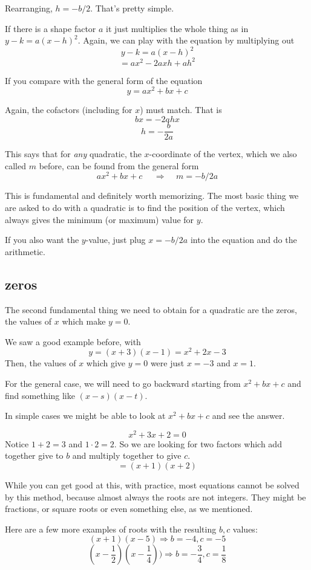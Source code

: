 \documentclass[11pt, oneside]{article}
\begin{document}
Rearranging, $h = -b/2$.  That's pretty simple.

If there is a shape factor $a$ it just multiplies the whole thing as in $y - k = a(x - h)^2$.  Again, we can play with the equation by multiplying out
\[ y - k = a(x - h)^2 \]
\[ = ax^2 - 2axh + ah^2 \]

If you compare with the general form of the equation
\[ y = ax^2 + bx + c \]

Again, the cofactors (including for $x$) must match.  That is
\[ bx = - 2ahx \]
\[ h = - \frac{b}{2a} \]

This says that for \emph{any} quadratic, the $x$-coordinate of the vertex, which we also called $m$ before, can be found from the general form
\[ ax^2 + bx + c  \ \ \ \ \ \ \Rightarrow  \ \ \ \ \ m = -b/2a \]

This is fundamental and definitely worth memorizing.  The most basic thing we are asked to do with a quadratic is to find the position of the vertex, which always gives the minimum (or maximum) value for $y$.

If you also want the $y$-value, just plug $x = -b/2a$ into the equation and do the arithmetic.

\subsection*{zeros}
The second fundamental thing we need to obtain for a quadratic are the zeros, the values of $x$ which make $y = 0$.

We saw a good example before, with
\[ y = (x + 3)(x - 1) = x^2 + 2x - 3 \]
Then, the values of $x$ which give $y = 0$ were just $x = -3$ and $x = 1$.  

For the general case, we will need to go backward starting from $x^2 + bx + c$ and find something like $(x - s)(x - t)$.  

In simple cases we might be able to look at $x^2 + bx + c$ and see the answer.

\[ x^2 + 3x + 2 = 0 \]
Notice $1 + 2 = 3$ and $1 \cdot 2 = 2$.  So we are looking for two factors which add together give to $b$ and multiply together to give $c$.
\[ = (x + 1)(x + 2) \]

While you can get good at this, with practice, most equations cannot be solved by this method, because almost always the roots are not integers.  They might be fractions, or square roots or even something else, as we mentioned.

Here are a few more examples of roots with the resulting $b,c$ values:
\[ (x + 1)(x - 5) \Rightarrow b = -4, c = -5 \]
\[ (x - \frac{1}{2})(x - \frac{1}{4})) \Rightarrow b = - \frac{3}{4}, c = \frac{1}{8} \]
\end{document}
